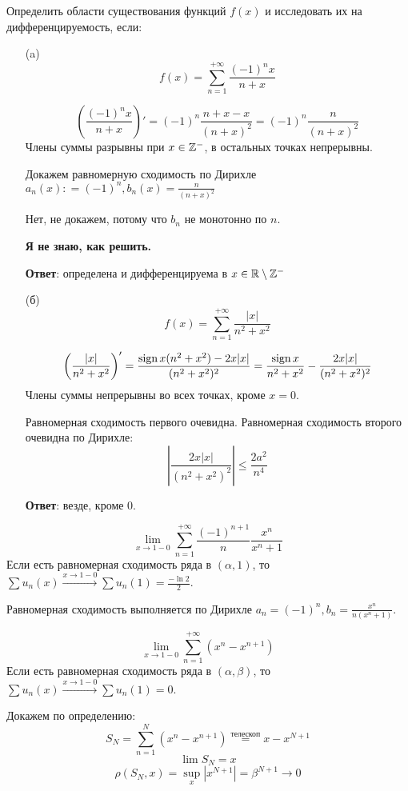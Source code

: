 \begin{exercise}[2799]
    Определить области существования функций \(f(x)\) и исследовать их на дифференцируемость, если:
    \begin{enumerate}
        \item [(a)] \[f(x) = \sum_{n = 1}^{+\infty} \frac{( - 1)^n x}{n + x} \]

              \[\left( \frac{( - 1)^n x}{n + x} \right)' = ( - 1)^n \frac{n + x - x}{(n + x)^2} = ( - 1)^n \frac{n}{(n + x)^2} \]
              Члены суммы разрывны при \(x \in \mathbb{Z}^{ -}\), в остальных точках непрерывны.

              Докажем равномерную сходимость по Дирихле \(a_n(x) : = ( - 1)^n, b_n(x) = \frac{n}{(n + x)^2}\)

              Нет, не докажем, потому что \(b_n\) не монотонно по \(n\).

              \textbf{Я не знаю, как решить.}

              \textbf{Ответ}: определена и дифференцируема в \(x\in \mathbb{R}\setminus \mathbb{Z}^{ -}\)
        \item [(б)] \[f(x) = \sum_{n = 1}^{+\infty} \frac{|x|}{n^2 + x^2}\]

              \[\left( \frac{|x|}{n^2 + x^2} \right)' = \frac{\operatorname{\text{sign}} x (n^2 + x^2) - 2x|x|}{(n^2 + x^2)^2} = \frac{\operatorname{\text{sign}} x}{n^2 + x^2} - \frac{2x|x|}{(n^2 + x^2)^2} \]
              Члены суммы непрерывны во всех точках, кроме \(x = 0\).

              Равномерная сходимость первого очевидна. Равномерная сходимость второго очевидна по Дирихле:
              \[|\frac{2x|x|}{(n^2 + x^2)^2}| \leq \frac{2a^2}{n^4}\]

              \textbf{Ответ}: везде, кроме 0.
    \end{enumerate}
\end{exercise}

\begin{exercise}[2806]
    \[\lim_{x\to 1 - 0} \sum_{n = 1}^{+\infty} \frac{( - 1)^{n + 1}}{n} \frac{x^n}{x^n + 1} \]
    Если есть равномерная сходимость ряда в \((\alpha, 1)\), то \(\sum u_n(x) \xrightarrow{x\to 1 - 0} \sum u_n(1) = \frac{-\ln 2}{2}\).

    Равномерная сходимость выполняется по Дирихле \(a_n =( - 1)^n, b_n = \frac{x^n}{n(x^n + 1)}\).
\end{exercise}

\begin{exercise}[2807]
    \[\lim_{x \to 1 - 0} \sum_{n = 1}^{+\infty} (x^n - x^{n + 1})\]
    Если есть равномерная сходимость ряда в \((\alpha, \beta)\), то \(\sum u_n(x) \xrightarrow{x\to 1 - 0} \sum u_n(1) = 0\).

    Докажем по определению:
    \[S_N = \sum_{n = 1}^{N} (x^n - x^{n + 1}) \stackrel{\text{телескоп}}{=} x - x^{N + 1}\]
    \[\lim S_N = x\]
    \[\rho(S_N, x) = \sup_x |x^{N + 1}| = \beta^{N + 1} \to 0\]
\end{exercise}

